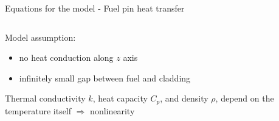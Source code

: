 \begin{frame}{Equations for the model - Fuel pin heat transfer}
\begin{columns}
\begin{column}{4cm}
    Model assumption:
    \begin{itemize}
    \item no heat conduction along $ z $ axis 
    \item infinitely small gap between fuel and cladding
    \end{itemize}

    \vspace{.5cm}

    Thermal conductivity $ k $, heat capacity $ C_p $, and density $ \rho $, depend on the temperature itself $ \Rightarrow $ nonlinearity

    \vspace{.5cm}


  \end{column}
  \end{columns}

\end{frame}



